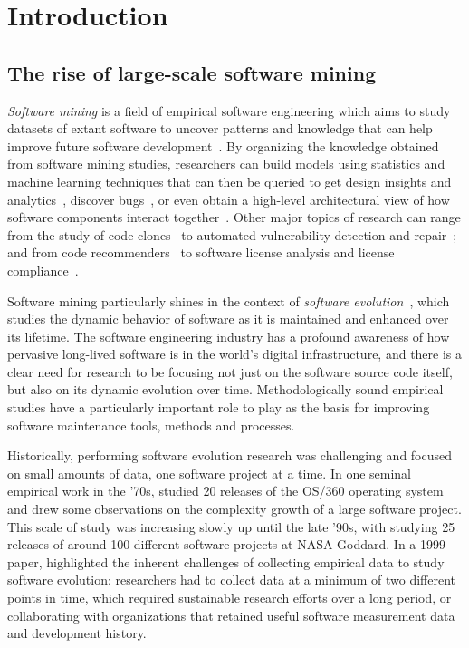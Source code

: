 \chapter{Introduction}%
\label{chp:introduction}

\section{The rise of large-scale software mining}

\emph{Software mining} is a field of empirical software engineering which aims
to study datasets of extant software to uncover patterns and knowledge that can
help improve future software development~\cite{2006-zeller-msr}. By organizing
the knowledge obtained from software mining studies, researchers can build
models using statistics and machine learning techniques that can then be
queried to get design insights and analytics~\cite{hassan2006mining}, discover
bugs~\cite{williams2005automatic,BugRepair2017}, or even obtain a high-level
architectural view of how software components interact
together~\cite{hassan2008road}.
Other major topics of research can range from the study of code
clones~\cite{SvajlenkoR17, SemuraYCI17, ThummalapentaCAP10,
rattan2013clonedetectionreview} to automated vulnerability detection and
repair~\cite{Li2017, Grieco2016, MartinezM15}; and from code
recommenders~\cite{Zeller2007, ZimmermannWDZ04} to software license analysis
and license compliance~\cite{GermanLicense17, VendomeLicence2015}.

Software mining particularly shines in the context of \emph{software
evolution}~\cite{mens2008swevolintro,kagdi2007msrsurvey}, which studies the
dynamic behavior of software as it is maintained and enhanced over its
lifetime. The software engineering industry has a profound awareness of how
pervasive long-lived software is in the world's digital infrastructure, and
there is a clear need for research to be focusing not just on the software
source code itself, but also on its dynamic evolution over time.
Methodologically sound empirical studies have a particularly important role to
play as the basis for improving software maintenance tools, methods and
processes.

Historically, performing software evolution research was challenging and
focused on small amounts of data, one software project at a time. In one
seminal empirical work in the '70s, \textcite{belady1976model}
studied 20 releases of the OS/360 operating system and drew some observations
on the complexity growth of a large software project. This scale of study was
increasing slowly up until the late '90s, with
\textcite{basili1996understanding} studying 25 releases of around 100 different
software projects at NASA Goddard.
In a 1999 paper, \textcite{kemerer1999empirical} highlighted the
inherent challenges of collecting empirical data to study software evolution:
researchers had to collect data at a minimum of two different points in time,
which required sustainable research efforts over a long period, or
collaborating with organizations that retained useful software measurement data
and development history.


